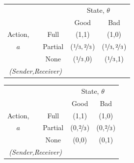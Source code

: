 \documentclass{beamer}
\begin{document}
\begin{frame}
\begin{card}[Manipulation 1]
	\begin{center}%
		\begin{tabular}{c|cc|c|c|}
		\multicolumn{1}{c}{} &  & \multicolumn{1}{c}{} & \multicolumn{2}{c}{State, $\theta$} \\ 
		\cline{4-5} 
		\multicolumn{1}{c}{} &  & \multicolumn{1}{c}{} & \multicolumn{1}{c}{Good} & \multicolumn{1}{c}{Bad} \\ 
		\cline{4-5} 
		Action, &  & Full & (1,1) & (1,0) \\ 
		\cline{4-5} 
		$a$ &  & Partial & ($\nicefrac{1}{3},\nicefrac{2}{3}$) & ($\nicefrac{1}{3},\nicefrac{2}{3}$) \\ 
		\cline{4-5} 
		 &  & None & ($\nicefrac{1}{3}$,0) & ($\nicefrac{1}{3}$,1) \\ 
		\cline{4-5} 
		\multicolumn{3}{c}{\emph{(Sender,Receiver)}} & \multicolumn{1}{c}{} & \multicolumn{1}{c}{} \\ 
		\end{tabular}
	\end{center}
\end{card}
\end{frame}

\begin{frame}
\begin{card}[Manipulation 2]
	\begin{center}%
		\begin{tabular}{c|cc|c|c|}
		\multicolumn{1}{c}{} &  & \multicolumn{1}{c}{} & \multicolumn{2}{c}{State, $\theta$} \\ 
		\cline{4-5} 
		\multicolumn{1}{c}{} &  & \multicolumn{1}{c}{} & \multicolumn{1}{c}{Good} & \multicolumn{1}{c}{Bad} \\ 
		\cline{4-5} 
		Action, &  & Full & (1,1) & (1,0) \\ 
		\cline{4-5} 
		$a$ &  & Partial & (0,$\nicefrac{2}{3}$) & (0,$\nicefrac{2}{3}$) \\ 
		\cline{4-5} 
		 &  & None & (0,0) & (0,1) \\ 
		\cline{4-5} 
		\multicolumn{3}{c}{\emph{(Sender,Receiver)}} & \multicolumn{1}{c}{} & \multicolumn{1}{c}{} \\ 
		\end{tabular}
	\end{center}
\end{card}
\end{frame}
\end{document}
